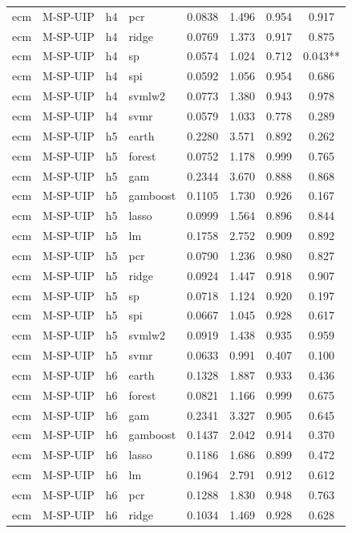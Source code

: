 \begin{ThreePartTable}
\begin{longtable}[t]{llclcccc}
ecm & M-SP-UIP & h4 & pcr & 0.0838 & 1.496 & 0.954 & 0.917\\
ecm & M-SP-UIP & h4 & ridge & 0.0769 & 1.373 & 0.917 & 0.875\\
ecm & M-SP-UIP & h4 & sp & 0.0574 & 1.024 & 0.712 & 0.043**\\
ecm & M-SP-UIP & h4 & spi & 0.0592 & 1.056 & 0.954 & 0.686\\
ecm & M-SP-UIP & h4 & svmlw2 & 0.0773 & 1.380 & 0.943 & 0.978\\
ecm & M-SP-UIP & h4 & svmr & 0.0579 & 1.033 & 0.778 & 0.289\\
\addlinespace
ecm & M-SP-UIP & h5 & earth & 0.2280 & 3.571 & 0.892 & 0.262\\
ecm & M-SP-UIP & h5 & forest & 0.0752 & 1.178 & 0.999 & 0.765\\
ecm & M-SP-UIP & h5 & gam & 0.2344 & 3.670 & 0.888 & 0.868\\
ecm & M-SP-UIP & h5 & gamboost & 0.1105 & 1.730 & 0.926 & 0.167\\
ecm & M-SP-UIP & h5 & lasso & 0.0999 & 1.564 & 0.896 & 0.844\\
ecm & M-SP-UIP & h5 & lm & 0.1758 & 2.752 & 0.909 & 0.892\\
ecm & M-SP-UIP & h5 & pcr & 0.0790 & 1.236 & 0.980 & 0.827\\
ecm & M-SP-UIP & h5 & ridge & 0.0924 & 1.447 & 0.918 & 0.907\\
ecm & M-SP-UIP & h5 & sp & 0.0718 & 1.124 & 0.920 & 0.197\\
ecm & M-SP-UIP & h5 & spi & 0.0667 & 1.045 & 0.928 & 0.617\\
ecm & M-SP-UIP & h5 & svmlw2 & 0.0919 & 1.438 & 0.935 & 0.959\\
ecm & M-SP-UIP & h5 & svmr & 0.0633 & 0.991 & 0.407 & 0.100\\
\addlinespace
ecm & M-SP-UIP & h6 & earth & 0.1328 & 1.887 & 0.933 & 0.436\\
ecm & M-SP-UIP & h6 & forest & 0.0821 & 1.166 & 0.999 & 0.675\\
ecm & M-SP-UIP & h6 & gam & 0.2341 & 3.327 & 0.905 & 0.645\\
ecm & M-SP-UIP & h6 & gamboost & 0.1437 & 2.042 & 0.914 & 0.370\\
ecm & M-SP-UIP & h6 & lasso & 0.1186 & 1.686 & 0.899 & 0.472\\
ecm & M-SP-UIP & h6 & lm & 0.1964 & 2.791 & 0.912 & 0.612\\
ecm & M-SP-UIP & h6 & pcr & 0.1288 & 1.830 & 0.948 & 0.763\\
ecm & M-SP-UIP & h6 & ridge & 0.1034 & 1.469 & 0.928 & 0.628\\

\end{longtable}
\end{ThreePartTable}
